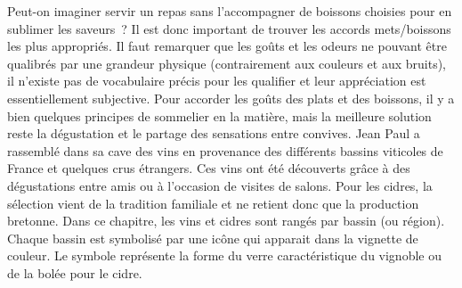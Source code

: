 Peut-on imaginer servir un repas sans l’accompagner de boissons choisies pour en sublimer les saveurs ? Il est donc important de trouver les accords mets/boissons les plus appropriés. Il faut remarquer que les goûts et les odeurs ne pouvant être qualibrés par une grandeur physique (contrairement aux couleurs et aux bruits), il n’existe pas de vocabulaire précis pour les qualifier et leur appréciation est essentiellement subjective.
Pour accorder les goûts des plats et des boissons, il y a bien quelques principes de sommelier en la matière, mais la meilleure solution reste la dégustation et le partage des sensations entre convives. 
Jean Paul a rassemblé dans sa cave des vins en provenance des différents bassins viticoles de France et quelques crus étrangers. Ces vins ont été découverts grâce à des dégustations entre amis ou à l’occasion de visites de salons. Pour les cidres, la sélection vient de la tradition familiale et ne retient donc que la production bretonne. 
Dans ce chapitre, les vins et cidres sont rangés par bassin (ou région). Chaque bassin est symbolisé par une icône qui apparait dans la vignette de couleur. Le symbole représente la forme du verre caractéristique du vignoble ou de la bolée pour le cidre.
\medskip
